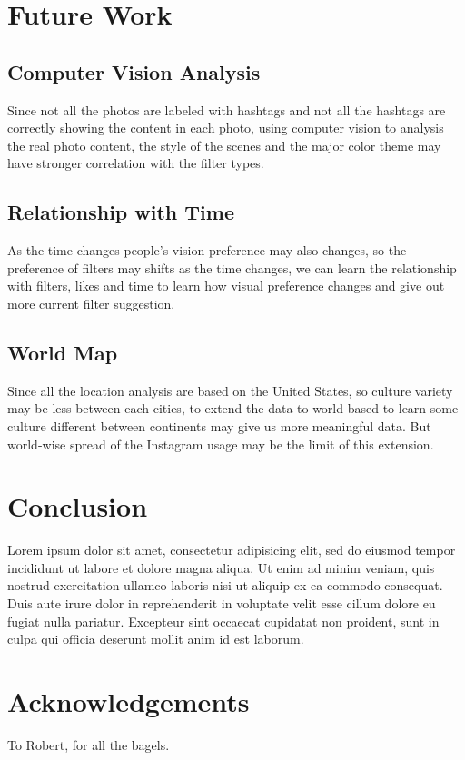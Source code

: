 \documentclass[conference]{acmsiggraph}
\begin{document}
\section{Future Work}

\subsection{Computer Vision Analysis}
Since not all the photos are labeled with hashtags and not all the hashtags are correctly showing the content in each photo, using computer vision to analysis the real photo content, the style of the scenes and the major color theme may have stronger correlation with the filter types.
\subsection{Relationship with Time}
As the time changes people’s vision preference may also changes, so the preference of filters may shifts as the time changes, we can learn the relationship with filters, likes and time to learn how visual preference changes and give out more current filter suggestion.
\subsection{World Map}
Since all the location analysis are based on the United States, so culture variety may be less between each cities, to extend the data to world based to learn some culture different between continents may give us more meaningful data. But world-wise spread of the Instagram usage may be the limit of this extension.

\section{Conclusion}

Lorem ipsum dolor sit amet, consectetur adipisicing elit, sed do
eiusmod tempor incididunt ut labore et dolore magna aliqua. Ut enim ad
minim veniam, quis nostrud exercitation ullamco laboris nisi ut
aliquip ex ea commodo consequat. Duis aute irure dolor in
reprehenderit in voluptate velit esse cillum dolore eu fugiat nulla
pariatur. Excepteur sint occaecat cupidatat non proident, sunt in
culpa qui officia deserunt mollit anim id est laborum.

\section*{Acknowledgements}

To Robert, for all the bagels.



\end{document}
